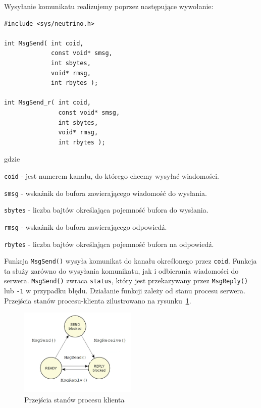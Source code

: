 Wysyłanie komunikatu realizujemy poprzez następujące wywołanie: 

\begin{lstlisting}[style=MyCStyle]
#include <sys/neutrino.h>

int MsgSend( int coid,
             const void* smsg,
             int sbytes,
             void* rmsg,
             int rbytes );

int MsgSend_r( int coid,
               const void* smsg,
               int sbytes,
               void* rmsg,
               int rbytes );
\end{lstlisting}

gdzie 

\begin{myitemize}
\item[] \lstinline[style=MyCStyle]{coid} - jest numerem kanału, do którego chcemy wysyłać wiadomości. 
\item[] \lstinline[style=MyCStyle]{smsg} - wskaźnik do bufora zawierającego wiadomość do wysłania. 
\item[] \lstinline[style=MyCStyle]{sbytes} - liczba bajtów określająca pojemność bufora do wysłania.
\item[] \lstinline[style=MyCStyle]{rmsg} - wskaźnik do bufora zawierającego odpowiedź. 
\item[] \lstinline[style=MyCStyle]{rbytes} - liczba bajtów określająca pojemność bufora na odpowiedź. 
\end{myitemize}

Funkcja \lstinline[style=MyCStyle]{MsgSend()} wysyła komunikat do kanału określonego przez \lstinline[style=MyCStyle]{coid}. Funkcja ta służy zarówno do wysyłania komunikatu, jak i odbierania wiadomości do serwera. \lstinline[style=MyCStyle]{MsgSend()} zwraca \lstinline[style=MyCStyle]{status}, który jest przekazywany przez \lstinline[style=MyCStyle]{MsgReply()} lub \lstinline[style=MyCStyle]{-1} w przypadku błędu. Działanie funkcji zależy od stanu procesu serwera. Przejścia stanów procesu-klienta zilustrowano na rysunku~\ref{fig:states1}. 

\begin{figure}[!h]
\centering
\includegraphics[width=0.5\textwidth]{img/states1}
\caption{Przejścia stanów procesu klienta}
\label{fig:states1}
\end{figure}

